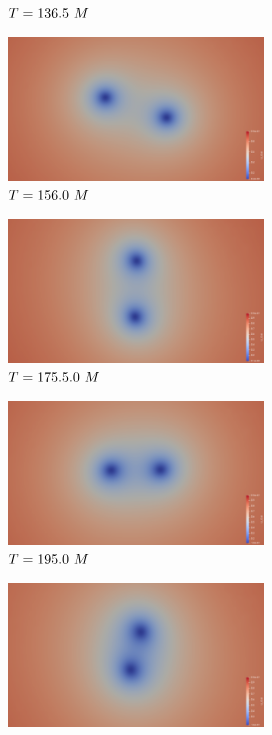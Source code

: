 \documentclass[landscape]{a0poster}
\begin{document}
\begin{textblock}{62}
\begin{textblock}{40}
\begin{figure}
\begin{subfigure}{0.0714\textwidth}
			\caption{\small ${T}=136.5~M$}
		\end{subfigure}
		\begin{subfigure}{0.0714\textwidth}
			\centering
			\includegraphics[height=1.5in]{figs/AE/r1/img_slice_000080.png}
			\caption{\small ${T}=156.0~M$}
		\end{subfigure}
		\begin{subfigure}{0.0714\textwidth}
			\centering
			\includegraphics[height=1.5in]{figs/AE/r1/img_slice_000090.png}
			\caption{\small ${T}=175.5.0~M$}
		\end{subfigure}
		\begin{subfigure}{0.0714\textwidth}
			\centering
			\includegraphics[height=1.5in]{figs/AE/r1/img_slice_000100.png}
			\caption{\small ${T}=195.0~M$}
		\end{subfigure}
		\begin{subfigure}{0.0714\textwidth}
			\includegraphics[height=1.5in]{figs/AE/r1/img_slice_000110.png}

\end{subfigure}
\end{figure}
\end{textblock}
\end{textblock}
\end{document}
